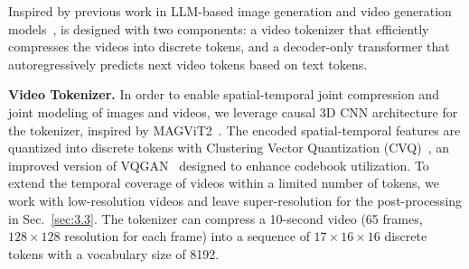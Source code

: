 Inspired by previous work in LLM-based image generation and video generation models~\cite{ramesh2021dalle,chang2022maskgit,yu2023magvit,yu2023language,kondratyuk2023videopoet}, \Ours is designed with two components: a video tokenizer that efficiently compresses the videos into discrete tokens, and a decoder-only transformer that autoregressively predicts next video tokens based on text tokens.


\textbf{Video Tokenizer.}
In order to enable spatial-temporal joint compression and joint modeling of images and videos, we leverage causal 3D CNN architecture for the tokenizer, inspired by MAGViT2~\cite{yu2023language}. 
The encoded spatial-temporal features are quantized into discrete tokens with Clustering Vector Quantization (CVQ)~\cite{Zheng_2023_CVQ}, an improved version of VQGAN~\cite{esser2020taming} designed to enhance codebook utilization. To extend the temporal coverage of videos within a limited number of tokens, we work with low-resolution videos and leave super-resolution for the post-processing in Sec.~\ref{sec:3.3}. The tokenizer can compress a 10-second video (65 frames, $128 \times 128$ resolution for each frame) into a sequence of $17 \times 16 \times 16$ discrete tokens with a vocabulary size of 8192.

